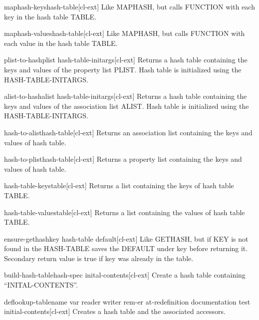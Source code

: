 \begin{function}{maphash-keys}{hash-table}[cl-ext]
  Like MAPHASH, but calls FUNCTION with each key in the hash table TABLE.
\end{function}

\begin{function}{maphash-values}{hash-table}[cl-ext]
  Like MAPHASH, but calls FUNCTION with each value in the hash table TABLE.
\end{function}

\begin{function}{plist-to-hash}{plist \rest hash-table-initargs}[cl-ext]
  Returns a hash table containing the keys and values of the property list
PLIST. Hash table is initialized using the HASH-TABLE-INITARGS.
\end{function}

\begin{function}{alist-to-hash}{alist \rest hash-table-initargs}[cl-ext]
  Returns a hash table containing the keys and values of the association list
ALIST. Hash table is initialized using the HASH-TABLE-INITARGS.
\end{function}

\begin{function}{hash-to-alist}{hash-table}[cl-ext]
  Returns an association list containing the keys and values of hash
  table.
\end{function}

\begin{function}{hash-to-plist}{hash-table}[cl-ext]
  Returns a property list containing the keys and values of hash
  table.
\end{function}

\begin{function}{hash-table-keys}{table}[cl-ext]
  Returns a list containing the keys of hash table TABLE.
\end{function}

\begin{function}{hash-table-values}{table}[cl-ext]
  Returns a list containing the values of hash table TABLE.
\end{function}

\begin{function}{ensure-gethash}{key hash-table \op default}[cl-ext]
  Like GETHASH, but if KEY is not found in the HASH-TABLE saves the DEFAULT
under key before returning it. Secondary return value is true if key was
already in the table.
\end{function}

\begin{function}{build-hash-table}{hash-spec inital-contents}[cl-ext]
  Create a hash table containing ``INITAL-CONTENTS''.
\end{function}

\begin{macro}{deflookup-table}{name \key var reader writer rem-er at-redefinition documentation test initial-contents}[cl-ext]
  Creates a hash table and the associated accessors.
\end{macro}
